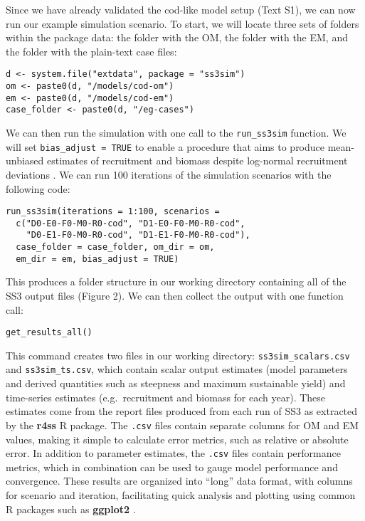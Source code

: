 \documentclass[11pt]{article}
\begin{document}
\begin{spacing}{1.2}
Since we have already validated the cod-like model setup (Text S1), we can now
run our example simulation scenario. To start, we will locate three sets of
folders within the package data: the folder with the OM, the folder with the
EM, and the folder with the plain-text case files:

\begin{verbatim}
d <- system.file("extdata", package = "ss3sim")
om <- paste0(d, "/models/cod-om")
em <- paste0(d, "/models/cod-em")
case_folder <- paste0(d, "/eg-cases")
\end{verbatim}

We can then run the simulation with one call to the \texttt{run\_ss3sim}
function. We will set \texttt{bias\_adjust = TRUE} to enable a procedure that
aims to produce mean-unbiased estimates of recruitment and biomass despite
log-normal recruitment deviations \cite{methot2011}. We can run 100 iterations
of the simulation scenarios with the following code:

\begin{verbatim}
run_ss3sim(iterations = 1:100, scenarios =
  c("D0-E0-F0-M0-R0-cod", "D1-E0-F0-M0-R0-cod",
    "D0-E1-F0-M0-R0-cod", "D1-E1-F0-M0-R0-cod"),
  case_folder = case_folder, om_dir = om,
  em_dir = em, bias_adjust = TRUE)
\end{verbatim}

\noindent
This produces a folder structure in our working directory containing all of the
SS3 output files (Figure 2). We can then collect the output with one
function call:

\begin{verbatim}
get_results_all()
\end{verbatim}

\noindent
This command creates two files in our working directory:
\texttt{ss3sim\_scalars.csv} and \texttt{ss3sim\_ts.csv}, which contain scalar
output estimates (model parameters and derived quantities such as
steepness and maximum sustainable yield) and time-series estimates
(e.g.~recruitment and biomass for each year). These estimates come from the
report files produced from each run of SS3 as extracted by the \textbf{r4ss}
\textsf{R} package. The \texttt{.csv} files contain separate columns for OM and
EM values, making it simple to calculate error metrics, such as relative or
absolute error. In addition to parameter estimates, the \texttt{.csv} files
contain performance metrics, which in combination can be used to gauge model
performance and convergence. These results are organized into ``long'' data
format, with columns for scenario and iteration, facilitating quick analysis
and plotting using common \textsf{R} packages such as \textbf{ggplot2}
\cite{wickham2009}.


\end{spacing}
\end{document}
